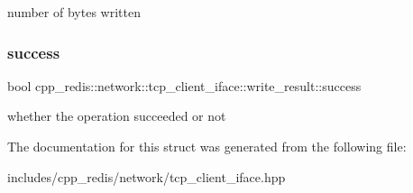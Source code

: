 number of bytes written \mbox{\label{structcpp__redis_1_1network_1_1tcp__client__iface_1_1write__result_a677696941c9a7164bc0b93b5d8380d1a}} 
\subsubsection{\texorpdfstring{success}{success}}
{\footnotesize\ttfamily bool cpp\+\_\+redis\+::network\+::tcp\+\_\+client\+\_\+iface\+::write\+\_\+result\+::success}

whether the operation succeeded or not 

The documentation for this struct was generated from the following file\+:\begin{DoxyCompactItemize}
\item 
includes/cpp\+\_\+redis/network/tcp\+\_\+client\+\_\+iface.\+hpp\end{DoxyCompactItemize}
